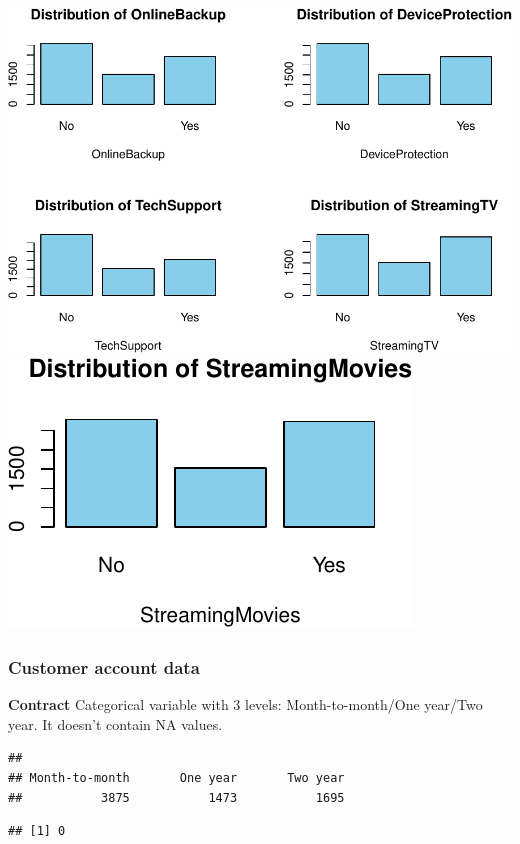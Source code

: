 \documentclass[
  twoside]{article}
\begin{document}
\includegraphics{Assigment2_files/figure-latex/unnamed-chunk-28-1.pdf}
\includegraphics{Assigment2_files/figure-latex/unnamed-chunk-28-2.pdf}

\hypertarget{customer-account-data}{%
\subsubsection{Customer account data}\label{customer-account-data}}

\textbf{Contract} Categorical variable with 3 levels: Month-to-month/One
year/Two year. It doesn't contain NA values.

\begin{verbatim}
## 
## Month-to-month       One year       Two year 
##           3875           1473           1695
\end{verbatim}

\begin{verbatim}
## [1] 0
\end{verbatim}
\end{document}
